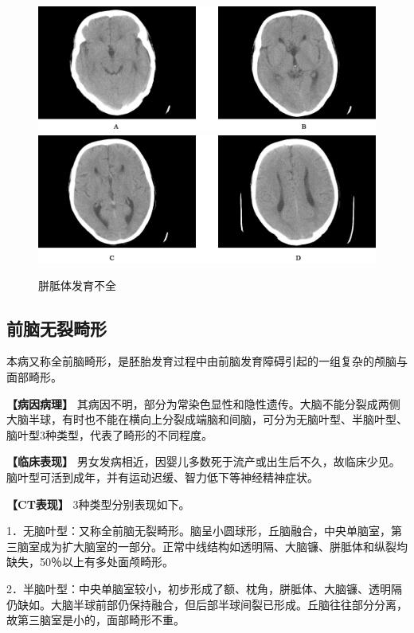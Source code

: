 \begin{figure}[!htbp]
 \centering
 \includegraphics[width=\textwidth,height=\textheight,keepaspectratio]{./images/Image00021.jpg}
 \includegraphics[width=\textwidth,height=\textheight,keepaspectratio]{./images/Image00022.jpg}
 \captionsetup{justification=centering}
 \caption{胼胝体发育不全}
 \label{fig2-6}
  \end{figure} 


\subsection{前脑无裂畸形}

本病又称全前脑畸形，是胚胎发育过程中由前脑发育障碍引起的一组复杂的颅脑与面部畸形。

\textbf{【病因病理】}
其病因不明，部分为常染色显性和隐性遗传。大脑不能分裂成两侧大脑半球，有时也不能在横向上分裂成端脑和间脑，可分为无脑叶型、半脑叶型、脑叶型3种类型，代表了畸形的不同程度。

\textbf{【临床表现】}
男女发病相近，因婴儿多数死于流产或出生后不久，故临床少见。脑叶型可活到成年，并有运动迟缓、智力低下等神经精神症状。

\textbf{【CT表现】} 3种类型分别表现如下。

1．无脑叶型：又称全前脑无裂畸形。脑呈小圆球形，丘脑融合，中央单脑室，第三脑室成为扩大脑室的一部分。正常中线结构如透明隔、大脑镰、胼胝体和纵裂均缺失，50％以上有多处面颅畸形。

2．半脑叶型：中央单脑室较小，初步形成了额、枕角，胼胝体、大脑镰、透明隔仍缺如。大脑半球前部仍保持融合，但后部半球间裂已形成。丘脑往往部分分离，故第三脑室是小的，面部畸形不重。

